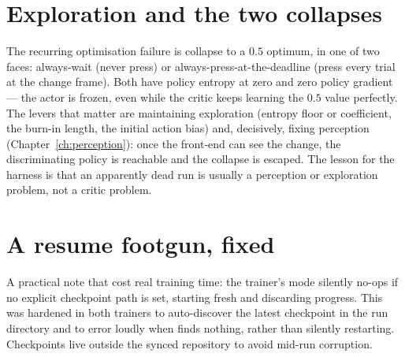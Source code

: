 \section{Exploration and the two collapses}
The recurring optimisation failure is collapse to a $0.5$ optimum, in one of two faces:
always-wait (never press) or always-press-at-the-deadline (press every trial at the change
frame). Both have policy entropy at zero and zero policy gradient --- the actor is frozen,
even while the critic keeps learning the $0.5$ value perfectly. The levers that matter are
maintaining exploration (entropy floor or coefficient, the burn-in length, the initial
action bias) and, decisively, fixing perception (Chapter~\ref{ch:perception}): once the
front-end can see the change, the discriminating policy is reachable and the collapse is
escaped. The lesson for the harness is that an apparently dead run is usually a perception
or exploration problem, not a critic problem.

\section{A resume footgun, fixed}
A practical note that cost real training time: the trainer's  mode silently
no-ops if no explicit checkpoint path is set, starting fresh and discarding progress. This
was hardened in both trainers to auto-discover the latest checkpoint in the run directory
and to error loudly when  finds nothing, rather than silently restarting.
Checkpoints live outside the synced repository to avoid mid-run corruption.
